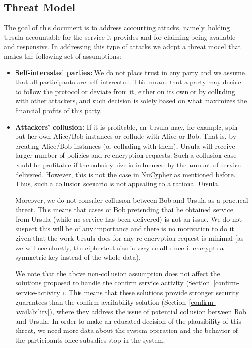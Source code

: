 \subsection{Threat Model}
The goal of this document is to address accounting attacks, namely, holding Ursula accountable for the service it provides and for claiming being available and responsive. In addressing this type of attacks we adopt a threat model that makes the following set of assumptions:
\begin{itemize}
\item {\bf Self-interested parties:} We do not place trust in any party and we assume that all participants are 
self-interested. This means that a party may decide to follow the protocol or deviate from it, either on its own or by colluding with other attackers, and such decision is solely based on what maximizes the financial profits
of this party.

\item {\bf Attackers' collusion:} If it is profitable, an Ursula may, for example, spin out her own Alice/Bob instances or collude with Alice or Bob. That is, by creating Alice/Bob instances (or colluding with them), Ursula will receive larger number of policies and re-encryption requests. Such a collusion case could be profitable if the subsidy size is influenced by the amount of service delivered. However, this is not the case in NuCypher as mentioned before. Thus, such a collusion scenario is not appealing to a rational Ursula. 


Moreover, we do not consider collusion between Bob and Ursula as a practical threat. This means that cases of Bob pretending that he obtained service from Ursula (while no service has been delivered) is not an issue. We do not suspect this will be of any importance and there is no motivation to do it given that the work Ursula does for any re-encryption request is minimal (as we will see shortly, the ciphertext size is very small since it encrypts a symmetric key instead of the whole data).


We note that the above non-collusion assumption does not affect the solutions proposed to handle the confirm service activity  (Section~\ref{confirm-service-activity}). This means that these solutions provide stronger security guarantees than the confirm availability solution (Section~\ref{confirm-availability}), where they address the issue of potential collusion between Bob and Ursula. In order to make an educated decision of the plausibility of this threat, we need more data about the system operation and the behavior of the participants once subsidies stop in the system. 



\end{itemize}
